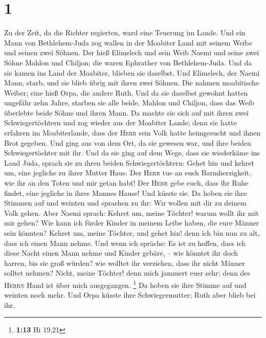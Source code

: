 \hypertarget{section}{%
\section{1}\label{section}}

 Zu der Zeit, da die Richter regierten, ward eine Teuerung
im Lande. Und ein Mann von Bethlehem-Juda zog wallen in der Moabiter
Land mit seinem Weibe und seinen zwei Söhnen.  Der hieß
Elimelech und sein Weib Naemi und seine zwei Söhne Mahlon und Chiljon;
die waren Ephrather von Bethlehem-Juda. Und da sie kamen ins Land der
Moabiter, blieben sie daselbst.  Und Elimelech, der Naemi
Mann, starb, und sie blieb übrig mit ihren zwei Söhnen. 
Die nahmen moabitische Weiber; eine hieß Orpa, die andere Ruth. Und da
sie daselbst gewohnt hatten ungefähr zehn Jahre,  starben
sie alle beide, Mahlon und Chiljon, dass das Weib überlebte beide Söhne
und ihren Mann.  Da machte sie sich auf mit ihren zwei
Schwiegertöchtern und zog wieder aus der Moabiter Lande; denn sie hatte
erfahren im Moabiterlande, dass der \textsc{Herr} sein Volk hatte
heimgesucht und ihnen Brot gegeben.  Und ging aus von dem
Ort, da sie gewesen war, und ihre beiden Schwiegertöchter mit ihr. Und
da sie ging auf dem Wege, dass sie wiederkäme ins Land Juda,
 sprach sie zu ihren beiden Schwiegertöchtern: Gehet hin
und kehret um, eine jegliche zu ihrer Mutter Haus. Der \textsc{Herr} tue
an euch Barmherzigkeit, wie ihr an den Toten und mir getan habt!
 Der \textsc{Herr} gebe euch, dass ihr Ruhe findet, eine
jegliche in ihres Mannes Hause! Und küsste sie. Da hoben sie ihre
Stimmen auf und weinten  und sprachen zu ihr: Wir wollen
mit dir zu deinem Volk gehen.  Aber Naemi sprach: Kehret
um, meine Töchter! warum wollt ihr mit mir gehen? Wie kann ich fürder
Kinder in meinem Leibe haben, die eure Männer sein könnten?
 Kehret um, meine Töchter, und gehet hin! denn ich bin
nun zu alt, dass ich einen Mann nehme. Und wenn ich spräche: Es ist zu
hoffen, dass ich diese Nacht einen Mann nehme und Kinder gebäre, --
 wie könntet ihr doch harren, bis sie groß würden? wie
wolltet ihr verziehen, dass ihr nicht Männer solltet nehmen? Nicht,
meine Töchter! denn mich jammert euer sehr; denn des \textsc{Herrn} Hand
ist über mich ausgegangen. \footnote{\textbf{1:13} Hi 19,21}
 Da hoben sie ihre Stimme auf und weinten noch mehr. Und
Orpa küsste ihre Schwiegermutter; Ruth aber blieb bei ihr.
